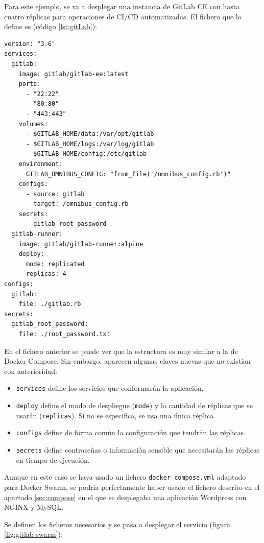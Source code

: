 Para este ejemplo, se va a desplegar una instancia de GitLab CE con hasta
cuatro réplicas para operaciones de CI/CD automatizadas. El fichero que lo
define es (código \ref{lst:gitLab}):

\begin{lstlisting}[style=docker-compose, caption={\texttt{docker-compose.yml} para una instancia de GitLab y 4 \textit{runners}.}, label={lst:gitlab}]
version: "3.6"
services:
  gitlab:
    image: gitlab/gitlab-ee:latest
    ports:
      - "22:22"
      - "80:80"
      - "443:443"
    volumes:
      - $GITLAB_HOME/data:/var/opt/gitlab
      - $GITLAB_HOME/logs:/var/log/gitlab
      - $GITLAB_HOME/config:/etc/gitlab
    environment:
      GITLAB_OMNIBUS_CONFIG: "from_file('/omnibus_config.rb')"
    configs:
      - source: gitlab
        target: /omnibus_config.rb
    secrets:
      - gitlab_root_password
  gitlab-runner:
    image: gitlab/gitlab-runner:alpine
    deploy:
      mode: replicated
      replicas: 4
configs:
  gitlab:
    file: ./gitlab.rb
secrets:
  gitlab_root_password:
    file: ./root_password.txt
\end{lstlisting}

En el fichero anterior se puede ver que la estructura es muy similar a la de
Docker Compose. Sin embargo, aparecen algunas claves nuevas que no existían con
anterioridad:

\begin{itemize}
    \item \texttt{services} define los servicios que conformarán la aplicación.
    \item \texttt{deploy} define el modo de despliegue (\texttt{mode}) y la cantidad
          de réplicas que se usarán (\texttt{replicas}). Si no se especifica, se
          usa una única réplica.
    \item \texttt{configs} define de forma común la configuración que tendrán las
          réplicas.
    \item \texttt{secrets} define contraseñas o información sensible que necesitarán
          las réplicas en tiempo de ejecución.
\end{itemize}

Aunque en este caso se haya usado un fichero \texttt{docker-compose.yml} adaptado
para Docker Swarm, se podría perfectamente haber usado el fichero descrito en
el apartado \ref{sec:compose} en el que se desplegaba una aplicación 
Wordpress con NGINX y MySQL.

Se definen los ficheros necesarios y se pasa a desplegar el servicio (figura \ref{fig:gitlab-swarm}):

